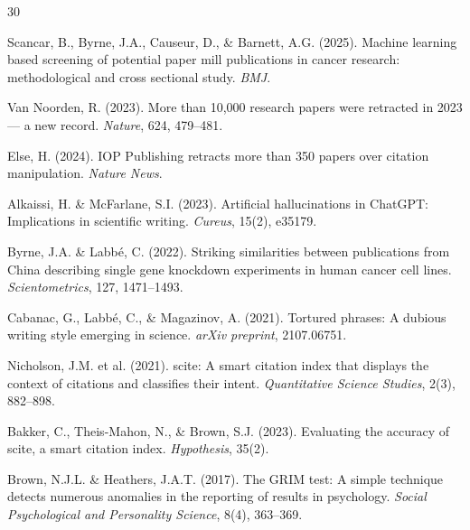 \documentclass[sigconf,nonacm]{acmart}
\begin{document}



\begin{thebibliography}{30}

Scancar, B., Byrne, J.A., Causeur, D., \& Barnett, A.G. (2025).
\newblock Machine learning based screening of potential paper mill publications in cancer research: methodological and cross sectional study.
\newblock \emph{BMJ}.

Van Noorden, R. (2023).
\newblock More than 10,000 research papers were retracted in 2023 --- a new record.
\newblock \emph{Nature}, 624, 479--481.

Else, H. (2024).
\newblock IOP Publishing retracts more than 350 papers over citation manipulation.
\newblock \emph{Nature News}.

Alkaissi, H. \& McFarlane, S.I. (2023).
\newblock Artificial hallucinations in ChatGPT: Implications in scientific writing.
\newblock \emph{Cureus}, 15(2), e35179.

Byrne, J.A. \& Labb\'{e}, C. (2022).
\newblock Striking similarities between publications from China describing single gene knockdown experiments in human cancer cell lines.
\newblock \emph{Scientometrics}, 127, 1471--1493.

Cabanac, G., Labb\'{e}, C., \& Magazinov, A. (2021).
\newblock Tortured phrases: A dubious writing style emerging in science.
\newblock \emph{arXiv preprint}, 2107.06751.

Nicholson, J.M. et al. (2021).
\newblock scite: A smart citation index that displays the context of citations and classifies their intent.
\newblock \emph{Quantitative Science Studies}, 2(3), 882--898.

Bakker, C., Theis-Mahon, N., \& Brown, S.J. (2023).
\newblock Evaluating the accuracy of scite, a smart citation index.
\newblock \emph{Hypothesis}, 35(2).

Brown, N.J.L. \& Heathers, J.A.T. (2017).
\newblock The GRIM test: A simple technique detects numerous anomalies in the reporting of results in psychology.
\newblock \emph{Social Psychological and Personality Science}, 8(4), 363--369.


\end{thebibliography}
\end{document}

